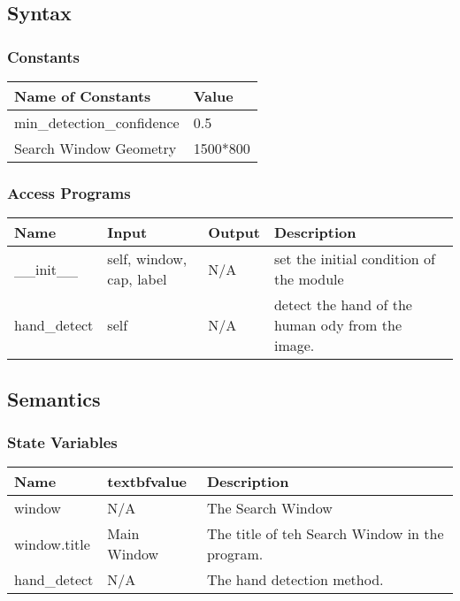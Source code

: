 \documentclass[12pt, titlepage]{article}
\begin{document}
\subsection{Syntax}

\subsubsection{Constants}

\begin{center}
\begin{tabular}{|p{8cm}|p{6cm}|}
\hline
\textbf{Name of Constants} & \textbf{Value}\\
\hline
min\_detection\_confidence & 0.5\\
\hline
Search Window Geometry & 1500*800\\
\hline
\end{tabular}
\end{center}

\subsubsection{Access Programs}

\begin{center}
\begin{tabular}{|l|l|l| p{7cm} |}
\hline
\textbf{Name} & \textbf{Input} & \textbf{Output} & \textbf{Description}  \\
\hline
\_\_init\_\_ & self, window, cap, label & N/A & set the initial condition of the module\\
\hline
hand\_detect & self& N/A & detect the hand of the human ody from the image.\\
\hline
\end{tabular}
\end{center}

\subsection{Semantics}

\subsubsection{State Variables}

\begin{center}
\begin{tabular}{|p{4cm}|p{4cm}|l|}
\hline
\textbf{Name} & textbf{value} & \textbf{Description}\\
\hline
window & N/A & The Search Window\\
\hline
window.title & Main Window & The title of teh Search Window in the program.\\
\hline
hand\_detect & N/A & The hand detection method.\\
\hline
\end{tabular}
\end{center}
\end{document}
